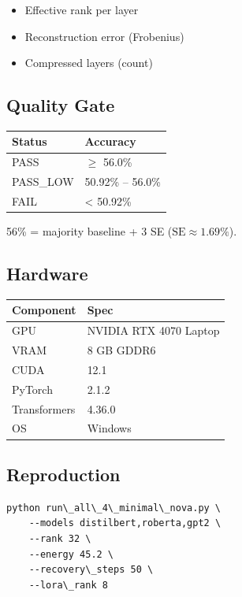 \begin{itemize}
\item Effective rank per layer
\item Reconstruction error (Frobenius)
\item Compressed layers (count)

\end{itemize}
\subsection{Quality Gate}

\begin{table}[H]
\centering
\small
\begin{tabular}{ll}
\toprule
\textbf{Status} & \textbf{Accuracy} \\
\midrule
PASS & $\ge$ 56.0\% \\
PASS\_LOW & 50.92\% -- 56.0\% \\
FAIL & \textless{} 50.92\% \\
\bottomrule
\end{tabular}
\end{table}

56\% = majority baseline + 3 SE ($\text{SE} \approx 1.69\%$).

\subsection{Hardware}

\begin{table}[H]
\centering
\small
\begin{tabular}{ll}
\toprule
\textbf{Component} & \textbf{Spec} \\
\midrule
GPU & NVIDIA RTX 4070 Laptop \\
VRAM & 8 GB GDDR6 \\
CUDA & 12.1 \\
PyTorch & 2.1.2 \\
Transformers & 4.36.0 \\
OS & Windows \\
\bottomrule
\end{tabular}
\end{table}

\subsection{Reproduction}

\begin{lstlisting}
python run\_all\_4\_minimal\_nova.py \
    --models distilbert,roberta,gpt2 \
    --rank 32 \
    --energy 45.2 \
    --recovery\_steps 50 \
    --lora\_rank 8
\end{lstlisting}

